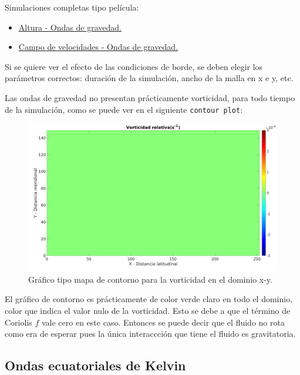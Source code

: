 \documentclass[12pt,dvipsnames]{exam}
\begin{document}
Simulaciones completas tipo película:
\begin{itemize}
    \item \href{https://www.youtube.com/watch?v=orZdrxbf_gk&list=PLO4Ke9LzSkdFyMJ0r6OuJdeCk4Ys-RJ3t&index=1}{Altura - Ondas de gravedad.}
    \item \href{https://www.youtube.com/watch?v=rBKvAQhE7c0&list=PLO4Ke9LzSkdFyMJ0r6OuJdeCk4Ys-RJ3t&index=2}{Campo de velocidades - Ondas de gravedad.}
\end{itemize}

Si se quiere ver el efecto de las condiciones de borde, se deben elegir los parámetros correctos: duración de la simulación, ancho de la malla en x e y, etc.

Las ondas de gravedad no presentan prácticamente vorticidad, para todo tiempo de la simulación, como se puede ver en el siguiente \texttt{contour plot}:


\begin{figure}[H]
\centering
\includegraphics[scale=0.35]{vort1.png}
\caption{Gráfico tipo mapa de contorno para la vorticidad en el dominio x-y.}
\label{vort_g}
\end{figure}

El gráfico de contorno es prácticamente de color verde claro en todo el dominio, color que indica el valor nulo de la vorticidad. Esto se debe a que el término de Coriolis $f$ vale cero en este caso. Entonces se puede decir que el fluido no rota como era de esperar pues la única interaccción que tiene el fluido es gravitatoria.

\subsection{Ondas ecuatoriales de Kelvin}
\end{document}

